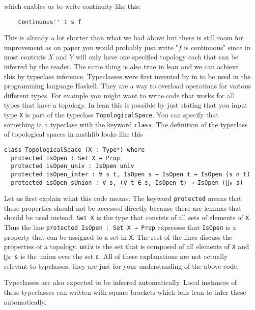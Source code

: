 which enables us to write continuity like this: 

\begin{lstlisting}
    Continuous'' t s f
\end{lstlisting}

This is already a lot shorter than what we had above but there is still room for improvement as on paper you would probably just write "$f$ is continuous" since in most contexts $X$ and $Y$ will only have one specified topology each that can be inferred by the reader. 
The same thing is also true in lean and we can achieve this by typeclass inference.
Typeclasses were first invented by  in \cite{Wadler1989} to be used in the programming language Haskell. 
They are a way to overload operations for various different types. 
For example you might want to write code that works for all types that have a topology. 
In lean this is possible by just stating that you input type \lstinline{X} is part of the typeclass \lstinline{TopologicalSpace}. 
You can specify that something ia a typeclass with the keyword \lstinline{class}. 
The definition of the typeclass of topological spaces in mathlib looks like this

\begin{lstlisting}
class TopologicalSpace (X : Type*) where
  protected IsOpen : Set X → Prop
  protected isOpen_univ : IsOpen univ
  protected isOpen_inter : ∀ s t, IsOpen s → IsOpen t → IsOpen (s ∩ t)
  protected isOpen_sUnion : ∀ s, (∀ t ∈ s, IsOpen t) → IsOpen (⋃₀ s)
\end{lstlisting}

Let us first explain what this code means: 
The keyword \lstinline{protected} means that these properties should not be accessed directly because there are lemmas that should be used instead. 
\lstinline{Set X} is the type that consists of all sets of elements of \lstinline{X}.
Thus the line \lstinline{protected IsOpen : Set X → Prop} expresses that \lstinline{IsOpen} is a property that can be assigned to a set in \lstinline{X}.
The rest of the lines discuss the properties of a topology.
\lstinline{univ} is the set that is composed of all elements of \lstinline{X} and \lstinline{⋃₀ s} is the union over the set \lstinline{s}. 
All of these explanations are not actually relevant to typclasses, they are just for your understanding of the above code. 

Typeclasses are also expected to be inferred automatically. 
Local instances of these typeclasses can written with square brackets which tells lean to infer these automatically.

